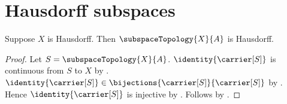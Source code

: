\section{Hausdorff subspaces}




\begin{theorem}\label{subspace_of_hausdorff_space}
    Suppose $X$ is Hausdorff.
    Then $\subspaceTopology{X}{A}$ is Hausdorff.
\end{theorem}
\begin{proof}
    Let $S=\subspaceTopology{X}{A}$.
    $\identity{\carrier[S]}$ is continuous from $S$ to $X$ by .
    $\identity{\carrier[S]}\in\bijections{\carrier[S]}{\carrier[S]}$ by .
    Hence $\identity{\carrier[S]}$ is injective by .
    Follows by .
\end{proof}
